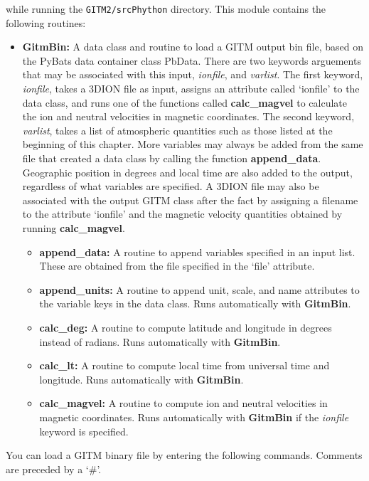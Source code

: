  
\noindent while running the {\tt GITM2/srcPhython} directory.  This module contains the following routines:

\begin{itemize}
\item[]{\bf GitmBin: } A data class and routine to load a GITM output bin file, based on the PyBats data container class PbData.  There are two keywords arguements that may be associated with this input, \textit{ionfile}, and \textit{varlist}.  The first keyword, \textit{ionfile}, takes a 3DION file as input, assigns an attribute called `ionfile' to the data class, and runs one of the functions called {\bf calc\_magvel} to calculate the ion and neutral velocities in magnetic coordinates.  The second keyword, \textit{varlist}, takes a list of atmospheric quantities such as those listed at the beginning of this chapter.  More variables may always be added from the same file that created a data class by calling the function {\bf append\_data}.  Geographic position in degrees and local time are also added to the output, regardless of what variables are specified.  A 3DION file may also be associated with the output GITM class after the fact by assigning a filename to the attribute `ionfile' and the magnetic velocity quantities obtained by running {\bf calc\_magvel}.
	\begin{itemize}
	\item[]{\bf append\_data: } A routine to append variables specified in an input list.  These are obtained from the file specified in the `file' attribute.
	\item[]{\bf append\_units: } A routine to append unit, scale, and name attributes to the variable keys in the data class.  Runs automatically with {\bf GitmBin}.
	\item[]{\bf calc\_deg: } A routine to compute latitude and longitude in degrees instead of radians.  Runs automatically with {\bf GitmBin}.
	\item[]{\bf calc\_lt: } A routine to compute local time from universal time and longitude.  Runs automatically with {\bf GitmBin}.
	\item[]{\bf calc\_magvel: } A routine to compute ion and neutral velocities in magnetic coordinates.  Runs automatically with {\bf GitmBin} if the \textit{ionfile} keyword is specified.
	\end{itemize}
\end{itemize}

You can load a GITM binary file by entering the following commands.  Comments are preceded by a `\#'.

